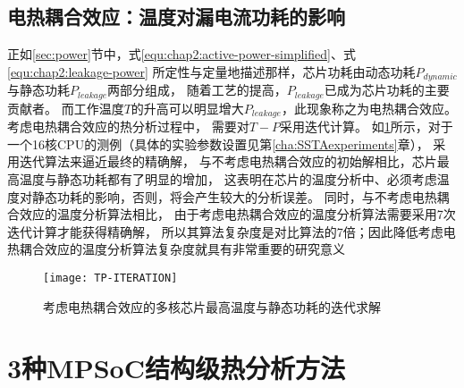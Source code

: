 \subsection{电热耦合效应：温度对漏电流功耗的影响}
正如\ref{sec:power}节中，式\ref{equ:chap2:active-power-simplified}、式\ref{equ:chap2:leakage-power} 所定性与定量地描述那样，芯片功耗由动态功耗$P_{dynamic}$与静态功耗$P_{leakage}$两部分组成， 随着工艺的提高，$P_{leakage}$已成为芯片功耗的主要贡献者。 而工作温度$T$的升高可以明显增大$P_{leakage}$，此现象称之为电热耦合效应。考虑电热耦合效应的热分析过程中， 需要对$T-P$采用迭代计算。
如\ref{fig:tp-iteration}所示，对于一个16核CPU的测例（具体的实验参数设置见第\ref{cha:SSTAexperiments}章）， 采用迭代算法来逼近最终的精确解， 与不考虑电热耦合效应的初始解相比，芯片最高温度与静态功耗都有了明显的增加， 这表明在芯片的温度分析中、必须考虑温度对静态功耗的影响，否则，将会产生较大的分析误差。 同时，与不考虑电热耦合效应的温度分析算法相比， 由于考虑电热耦合效应的温度分析算法需要采用7次迭代计算才能获得精确解， 所以其算法复杂度是对比算法的7倍；因此降低考虑电热耦合效应的温度分析算法复杂度就具有非常重要的研究意义
\begin{figure}[H]
  \centering
  \texttt{[image: TP-ITERATION]}
  \caption{考虑电热耦合效应的多核芯片最高温度与静态功耗的迭代求解}
  \label{fig:tp-iteration}
\end{figure}


\section{3种MPSoC结构级热分析方法}
\label{sec:SSTAmethod}

